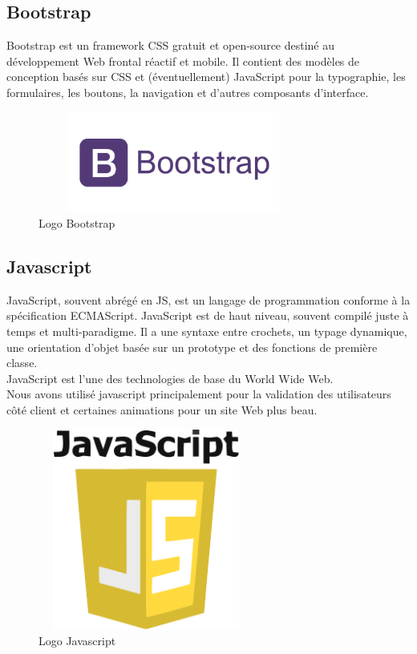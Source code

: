 \documentclass[12pt]{report}
\begin{document}
\subsection{Bootstrap}

Bootstrap est un framework CSS gratuit et open-source destiné au développement Web frontal réactif et mobile. Il contient des modèles de conception basés sur CSS et (éventuellement) JavaScript pour la typographie, les formulaires, les boutons, la navigation et d'autres composants d'interface.

\begin{figure}[h]
\centering
    \includegraphics[width = 3.5in, height = 1.3in]{../Images/Bootstrap.png}
\vspace{-0.2in}
\caption{Logo Bootstrap}
\end{figure}

\newpage

\subsection{Javascript}

JavaScript, souvent abrégé en JS, est un langage de programmation conforme à la spécification ECMAScript. JavaScript est de haut niveau, souvent compilé juste à temps et multi-paradigme. Il a une syntaxe entre crochets, un typage dynamique, une orientation d'objet basée sur un prototype et des fonctions de première classe.
\\
JavaScript est l'une des technologies de base du World Wide Web.
\\
Nous avons utilisé javascript principalement pour la validation des utilisateurs côté client et certaines animations pour un site Web plus beau.


\begin{figure}[h]
\centering
    \includegraphics[width = 2.8in, height = 2.6in]{../Images/JS.png}
\caption{Logo Javascript}
\end{figure}
\end{document}
